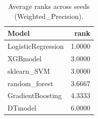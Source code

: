 \begin{table}[t]
\centering
\begin{tabular}{lr}
\toprule
Model & rank \\
\midrule
LogisticRegression & 1.0000 \\
XGBmodel & 3.0000 \\
sklearn_SVM & 3.0000 \\
random_forest & 3.6667 \\
GradientBoosting & 4.3333 \\
DTmodel & 6.0000 \\
\bottomrule
\end{tabular}
\caption{Average ranks across seeds (Weighted_Precision).}
\label{tab:avg_rank_Weighted_Precision}
\end{table}